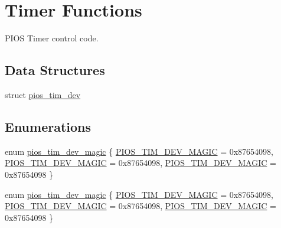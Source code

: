 \hypertarget{group___p_i_o_s___t_i_m}{\section{Timer Functions}
\label{group___p_i_o_s___t_i_m}
}


P\-I\-O\-S Timer control code.  


\subsection*{Data Structures}
\begin{DoxyCompactItemize}
\item 
struct \hyperlink{structpios__tim__dev}{pios\-\_\-tim\-\_\-dev}
\end{DoxyCompactItemize}
\subsection*{Enumerations}
\begin{DoxyCompactItemize}
\item 
enum \hyperlink{group___p_i_o_s___t_i_m_ga7d425167804fd43bc76fe29c11386a6c}{pios\-\_\-tim\-\_\-dev\-\_\-magic} \{ \hyperlink{group___p_i_o_s___t_i_m_gga7d425167804fd43bc76fe29c11386a6ca0c5dc16440e893937250b8ab7e88f777}{P\-I\-O\-S\-\_\-\-T\-I\-M\-\_\-\-D\-E\-V\-\_\-\-M\-A\-G\-I\-C} = 0x87654098, 
\hyperlink{group___p_i_o_s___t_i_m_gga7d425167804fd43bc76fe29c11386a6ca0c5dc16440e893937250b8ab7e88f777}{P\-I\-O\-S\-\_\-\-T\-I\-M\-\_\-\-D\-E\-V\-\_\-\-M\-A\-G\-I\-C} = 0x87654098, 
\hyperlink{group___p_i_o_s___t_i_m_gga7d425167804fd43bc76fe29c11386a6ca0c5dc16440e893937250b8ab7e88f777}{P\-I\-O\-S\-\_\-\-T\-I\-M\-\_\-\-D\-E\-V\-\_\-\-M\-A\-G\-I\-C} = 0x87654098
 \}
\item 
enum \hyperlink{group___p_i_o_s___t_i_m_ga7d425167804fd43bc76fe29c11386a6c}{pios\-\_\-tim\-\_\-dev\-\_\-magic} \{ \hyperlink{group___p_i_o_s___t_i_m_gga7d425167804fd43bc76fe29c11386a6ca0c5dc16440e893937250b8ab7e88f777}{P\-I\-O\-S\-\_\-\-T\-I\-M\-\_\-\-D\-E\-V\-\_\-\-M\-A\-G\-I\-C} = 0x87654098, 
\hyperlink{group___p_i_o_s___t_i_m_gga7d425167804fd43bc76fe29c11386a6ca0c5dc16440e893937250b8ab7e88f777}{P\-I\-O\-S\-\_\-\-T\-I\-M\-\_\-\-D\-E\-V\-\_\-\-M\-A\-G\-I\-C} = 0x87654098, 
\hyperlink{group___p_i_o_s___t_i_m_gga7d425167804fd43bc76fe29c11386a6ca0c5dc16440e893937250b8ab7e88f777}{P\-I\-O\-S\-\_\-\-T\-I\-M\-\_\-\-D\-E\-V\-\_\-\-M\-A\-G\-I\-C} = 0x87654098
 \}
\end{DoxyCompactItemize}
